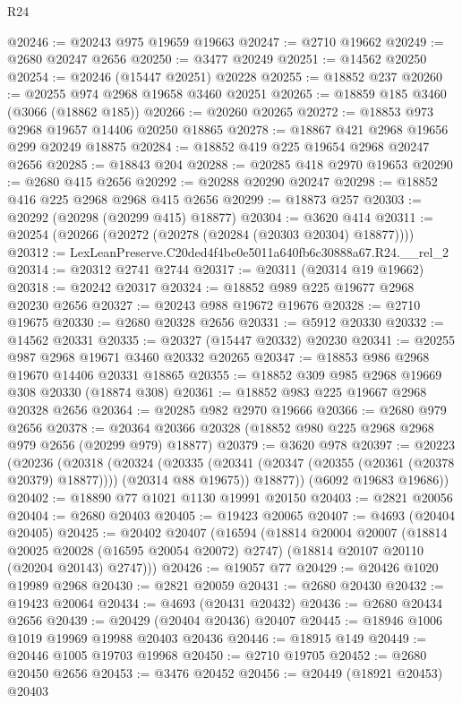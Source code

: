 \begin{lexlean}{R24}
\begin{coremodule}
@20246 := @20243 @975 @19659 @19663
@20247 := @2710 @19662
@20249 := @2680 @20247 @2656
@20250 := @3477 @20249
@20251 := @14562 @20250
@20254 := @20246 (@15447 @20251) @20228
@20255 := @18852 @237
@20260 := @20255 @974 @2968 @19658 @3460 @20251
@20265 := @18859 @185 @3460 (@3066 (@18862 @185))
@20266 := @20260 @20265
@20272 := @18853 @973 @2968 @19657 @14406 @20250 @18865
@20278 := @18867 @421 @2968 @19656 @299 @20249 @18875
@20284 := @18852 @419 @225 @19654 @2968 @20247 @2656
@20285 := @18843 @204
@20288 := @20285 @418 @2970 @19653
@20290 := @2680 @415 @2656
@20292 := @20288 @20290 @20247
@20298 := @18852 @416 @225 @2968 @2968 @415 @2656
@20299 := @18873 @257
@20303 := @20292 (@20298 (@20299 @415) @18877)
@20304 := @3620 @414
@20311 := @20254 (@20266 (@20272 (@20278 (@20284 (@20303 @20304) @18877))))
@20312 := LexLeanPreserve.C20ded4f4be0e5011a640fb6c30888a67.R24.__rel_2
@20314 := @20312 @2741 @2744
@20317 := @20311 (@20314 @19 @19662)
@20318 := @20242 @20317
@20324 := @18852 @989 @225 @19677 @2968 @20230 @2656
@20327 := @20243 @988 @19672 @19676
@20328 := @2710 @19675
@20330 := @2680 @20328 @2656
@20331 := @5912 @20330
@20332 := @14562 @20331
@20335 := @20327 (@15447 @20332) @20230
@20341 := @20255 @987 @2968 @19671 @3460 @20332 @20265
@20347 := @18853 @986 @2968 @19670 @14406 @20331 @18865
@20355 := @18852 @309 @985 @2968 @19669 @308 @20330 (@18874 @308)
@20361 := @18852 @983 @225 @19667 @2968 @20328 @2656
@20364 := @20285 @982 @2970 @19666
@20366 := @2680 @979 @2656
@20378 := @20364 @20366 @20328 (@18852 @980 @225 @2968 @2968 @979 @2656 (@20299 @979) @18877)
@20379 := @3620 @978
@20397 := @20223
    (@20236
      (@20318
        (@20324
          (@20335 (@20341 (@20347 (@20355 (@20361 (@20378 @20379) @18877)))) (@20314 @88 @19675))
          @18877))
      (@6092 @19683 @19686))
@20402 := @18890 @77 @1021 @1130 @19991 @20150
@20403 := @2821 @20056
@20404 := @2680 @20403
@20405 := @19423 @20065
@20407 := @4693 (@20404 @20405)
@20425 := @20402
    @20407
    (@16594
      (@18814
        @20004
        @20007
        (@18814 @20025 @20028 (@16595 @20054 @20072) @2747)
        (@18814 @20107 @20110 (@20204 @20143) @2747)))
@20426 := @19057 @77
@20429 := @20426 @1020 @19989 @2968
@20430 := @2821 @20059
@20431 := @2680 @20430
@20432 := @19423 @20064
@20434 := @4693 (@20431 @20432)
@20436 := @2680 @20434 @2656
@20439 := @20429 (@20404 @20436) @20407
@20445 := @18946 @1006 @1019 @19969 @19988 @20403 @20436
@20446 := @18915 @149
@20449 := @20446 @1005 @19703 @19968
@20450 := @2710 @19705
@20452 := @2680 @20450 @2656
@20453 := @3476 @20452
@20456 := @20449 (@18921 @20453) @20403

\end{coremodule}
\end{lexlean}
